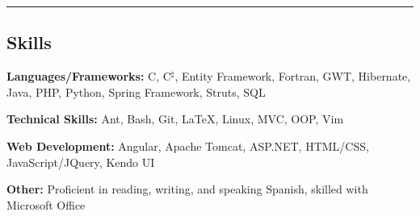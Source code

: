 \documentclass[11pt,letterpaper]{article}
\newenvironment{shortlist}
{\setlength{\linewidth}{0.9\linewidth}
\begin{itemize}
}
{\end{itemize}}
\begin{document}
\begin{itemize}
\begin{shortlist}
	\end{shortlist}

\end{itemize}

\hrule
\vspace{-0.4em}
\subsection*{Skills}

\begin{itemize*}
    \item[]
    \textbf{Languages/Frameworks: } C, C$^\sharp$, Entity Framework, Fortran, GWT, Hibernate, Java, PHP, Python, Spring Framework, Struts, SQL
    \vspace{0.2em}

    \item[]
    \textbf{Technical Skills: } Ant, Bash, Git, \LaTeX, Linux, MVC, OOP, Vim

    \vspace{0.2em}

    \item[]
    \textbf{Web Development: } Angular, Apache Tomcat, ASP.NET, HTML/CSS, JavaScript/JQuery, Kendo UI
    \vspace{0.2em}

    \item[]
    \textbf{Other: } Proficient in reading, writing, and speaking Spanish, skilled with Microsoft Office

\end{itemize*}
\end{document}
